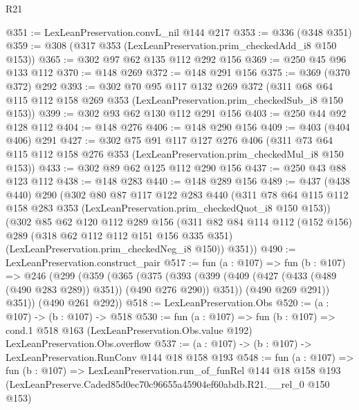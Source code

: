 \begin{lexlean}{R21}
\begin{coremodule}
@351 := LexLeanPreservation.convL_nil @144 @217
@353 := @336 (@348 @351)
@359 := @308 (@317 @353 (LexLeanPreservation.prim_checkedAdd_i8 @150 @153))
@365 := @302 @97 @62 @135 @112 @292 @156
@369 := @250 @45 @96 @133 @112
@370 := @148 @269
@372 := @148 @291 @156
@375 := @369 (@370 @372) @292
@393 := @302
    @70
    @95
    @117
    @132
    @269
    @372
    (@311 @68 @64 @115 @112 @158 @269 @353 (LexLeanPreservation.prim_checkedSub_i8 @150 @153))
@399 := @302 @93 @62 @130 @112 @291 @156
@403 := @250 @44 @92 @128 @112
@404 := @148 @276
@406 := @148 @290 @156
@409 := @403 (@404 @406) @291
@427 := @302
    @75
    @91
    @117
    @127
    @276
    @406
    (@311 @73 @64 @115 @112 @158 @276 @353 (LexLeanPreservation.prim_checkedMul_i8 @150 @153))
@433 := @302 @89 @62 @125 @112 @290 @156
@437 := @250 @43 @88 @123 @112
@438 := @148 @283
@440 := @148 @289 @156
@489 := @437
    (@438 @440)
    @290
    (@302
      @80
      @87
      @117
      @122
      @283
      @440
      (@311 @78 @64 @115 @112 @158 @283 @353 (LexLeanPreservation.prim_checkedQuot_i8 @150 @153))
      (@302
        @85
        @62
        @120
        @112
        @289
        @156
        (@311
          @82
          @84
          @114
          @112
          (@152 @156)
          @289
          (@318 @62 @112 @112 @151 @156 @335 @351)
          (LexLeanPreservation.prim_checkedNeg_i8 @150))
        @351))
@490 := LexLeanPreservation.construct_pair
@517 := fun (a : @107) =>
  fun (b : @107) =>
  @246
    (@299
      (@359
        (@365
          (@375
            (@393 (@399 (@409 (@427 (@433 (@489 (@490 @283 @289)) @351)) (@490 @276 @290)) @351))
            (@490 @269 @291))
          @351))
      (@490 @261 @292))
@518 := LexLeanPreservation.Obs
@520 := (a : @107) -> (b : @107) -> @518
@530 := fun (a : @107) =>
  fun (b : @107) =>
  cond.{1} @518 @163 (LexLeanPreservation.Obs.value @192) LexLeanPreservation.Obs.overflow
@537 := (a : @107) -> (b : @107) -> LexLeanPreservation.RunConv @144 @18 @158 @193
@548 := fun (a : @107) =>
  fun (b : @107) =>
  LexLeanPreservation.run_of_funRel
    @144
    @18
    @158
    @193
    (LexLeanPreserve.Caded85d0ec70c96655a45904ef60abdb.R21.__rel_0 @150 @153)
\end{coremodule}
\end{lexlean}
